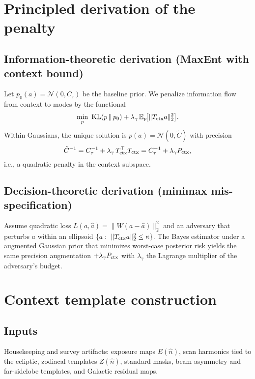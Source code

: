 \documentclass[11pt]{article}
\begin{document}
\section{Principled derivation of the penalty}
\label{sec:derivation}

\subsection{Information-theoretic derivation (MaxEnt with context bound)}
Let $p_0(a)=\mathcal N(0,C_\tau)$ be the baseline prior. We penalize information flow from context to modes by the functional
\begin{equation}\label{eq:infoprog}
\min_{p}\ \mathrm{KL}(p\,\|\,p_0) + \lambda_\gamma\,\mathbb E_p\!\big[\|T_{\rm ctx}a\|_2^2\big].
\end{equation}
Within Gaussians, the unique solution is $p(a)=\mathcal N(0,\tilde C)$ with precision
\begin{equation}
\tilde C^{-1} = C_\tau^{-1} + \lambda_\gamma\, T_{\rm ctx}^\top T_{\rm ctx} = C_\tau^{-1} + \lambda_\gamma P_{\rm ctx},
\end{equation}
i.e., a quadratic penalty in the context subspace.

\subsection{Decision-theoretic derivation (minimax mis-specification)}
Assume quadratic loss $L(a,\hat a)=\|W(a-\hat a)\|_2^2$ and an adversary that perturbs $a$ within an ellipsoid $\{a:\ \|T_{\rm ctx}a\|_2^2\le \kappa\}$. The Bayes estimator under a augmented Gaussian prior that minimizes worst-case posterior risk yields the same precision augmentation $+\lambda_\gamma P_{\rm ctx}$ with $\lambda_\gamma$ the Lagrange multiplier of the adversary's budget.

\section{Context template construction}
\label{sec:templates}

\subsection{Inputs}
Housekeeping and survey artifacts: exposure maps $E(\hat n)$, scan harmonics tied to the ecliptic, zodiacal templates $Z(\hat n)$, standard masks, beam asymmetry and far-sidelobe templates, and Galactic residual maps.
\end{document}
